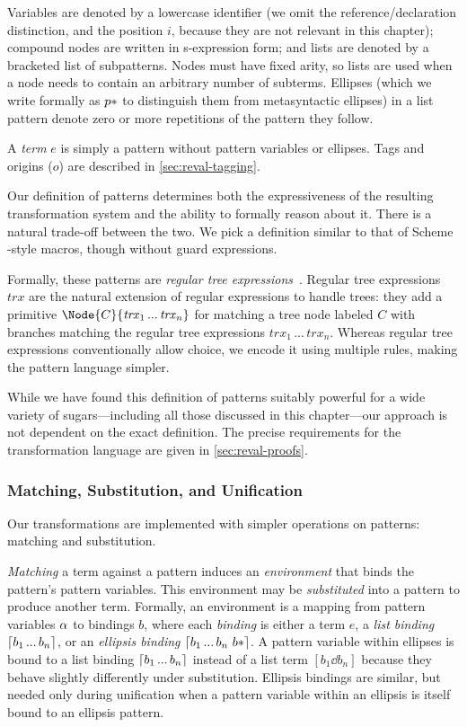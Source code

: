 Variables are denoted by a lowercase
identifier (we omit the reference/declaration distinction, and the
position $i$, because they are not relevant in this chapter);
compound nodes are written in s-expression form;
and lists are denoted by a
bracketed list of subpatterns. Nodes must have fixed arity, so lists are
used when a node needs to contain an arbitrary number of subterms.
Ellipses (which we write formally as $p*$ to distinguish them
from metasyntactic ellipses) in a list pattern denote zero or more
repetitions of the pattern
they follow.

A \emph{term} $e$ is simply a pattern without pattern variables or
ellipses. Tags and origins ($o$) are described in \cref{sec:reval-tagging}.

Our definition of patterns determines both the expressiveness of the
resulting transformation system and the ability to formally reason about
it. There is a natural trade-off between the two. We pick a definition similar to
that of Scheme -style macros, though without guard
expressions.

Formally, these patterns are \emph{regular tree
  expressions}~\cite{regular-tree-expressions}. Regular tree
expressions $\mathit{trx}$ are the natural extension of regular
expressions to handle trees: they add a primitive $\Node{C}{\mathit{trx}_1
\,...\,\mathit{trx}_n}$ for matching a tree node labeled $C$ with
branches matching the regular tree expressions
$\mathit{trx}_1\,...\,\mathit{trx}_n$. Whereas regular tree
expressions conventionally allow choice, we encode it using multiple
rules, making the pattern language simpler.

While we have found this definition of patterns suitably powerful for a
wide variety of sugars---including all those discussed in this chapter---our
approach is not dependent on the exact definition. The precise
requirements for the transformation language are given in
\cref{sec:reval-proofs}.



\subsubsection{Matching, Substitution, and Unification}

Our transformations are implemented with simpler operations on patterns:
matching and substitution.

\emph{Matching} a term against a pattern induces an \emph{environment}
that binds the pattern's pattern variables. This environment may be
\emph{substituted} into a pattern to produce another term. Formally, an
environment is a mapping from pattern variables $\alpha$ to bindings $b$,
where each \emph{binding} is either a term $e$, a \emph{list binding}
$\lceil b_1 \,...\, b_n \rceil$, or an \emph{ellipsis binding}
$\lceil b_1 \,...\, b_n\ b* \rceil$. A pattern variable within ellipses is
bound to a list binding $\lceil b_1 \,...\, b_n \rceil$ instead of a list term
$[b_1 \dd b_n]$ because they behave slightly differently under
substitution. Ellipsis bindings are similar, but needed only during
unification when a pattern variable within an ellipsis is itself bound to an
ellipsis pattern.

